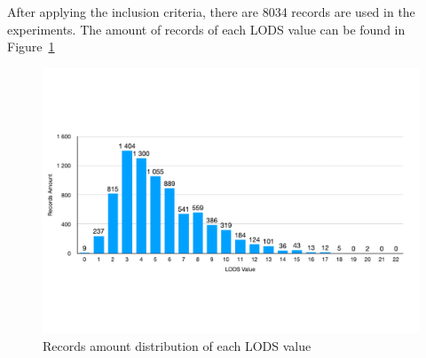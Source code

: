 \documentclass[12pt,a4paper,english
]{tunithesis}
\begin{document}
After applying the inclusion criteria, there are 8034 records are used in the experiments. The amount of records of each LODS value can be found in Figure~\ref{fig:lods_distri_fig}

\begin{figure}[t]
  \begin{center}
    \includegraphics[width=1.0\textwidth]{thesis/img/lods_record_distribution.pdf}
  \end{center}
  \caption[Record amount of each lods value]{Records amount distribution of each LODS value}
  \label{fig:lods_distri_fig}
\end{figure}
\end{document}
